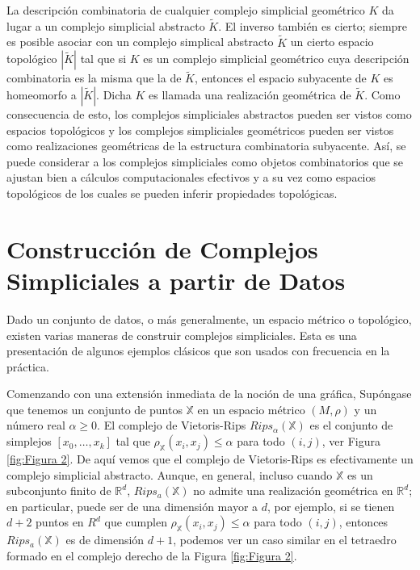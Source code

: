 La descripci\'on combinatoria de cualquier complejo simplicial geom\'etrico $K$ da lugar a un complejo
simplicial abstracto $\tilde{K}$. El inverso tambi\'en es cierto; siempre es posible asociar con un
complejo simplical abstracto $\tilde{K}$ un cierto espacio topol\'ogico $|\tilde{K}|$
tal que si $K$ es un complejo simplicial geom\'etrico cuya descripci\'on combinatoria es la misma
que la de $\tilde{K}$, entonces el espacio subyacente de $K$ es homeomorfo a $|\tilde{K}|$.
Dicha $K$ es llamada una realizaci\'on geom\'etrica de $\tilde{K}$. Como consecuencia de esto,
los complejos simpliciales abstractos pueden ser vistos como espacios topol\'ogicos y los complejos
simpliciales geom\'etricos pueden ser vistos como realizaciones geom\'etricas de la estructura combinatoria
subyacente. As\'i, se puede considerar a los complejos simpliciales como objetos combinatorios que se
ajustan bien a c\'alculos computacionales efectivos y a su vez como espacios topol\'ogicos de los cuales se pueden
inferir propiedades topol\'ogicas.

\section*{Construcci\'on de Complejos Simpliciales a partir de Datos}

Dado un conjunto de datos, o m\'as generalmente, un espacio m\'etrico o topol\'ogico, existen varias
maneras de construir complejos simpliciales. Esta es una presentaci\'on de algunos ejemplos cl\'asicos
que son usados con frecuencia en la pr\'actica.

Comenzando con una extensi\'on inmediata de la noci\'on de una gr\'afica, Sup\'ongase que
tenemos un conjunto de puntos $\mathbb{X}$ en un espacio m\'etrico $\left(M, \rho\right)$ y un n\'umero
real $\alpha \geq 0$. El complejo de Vietoris-Rips $Rips_{\alpha}\left(\mathbb{X}\right)$ es el conjunto
de simplejos $\left[x_{0}, \dots, x_{k}\right]$ tal que
$\rho_{\mathbb{X}}\left(x_{i}, x_{j}\right)\leq\alpha$ para todo
$\left(i, j\right)$, ver Figura \ref{fig:Figura 2}. De aqu\'i vemos que el complejo de
Vietoris-Rips es efectivamente
un complejo simplicial abstracto. Aunque, en general, incluso cuando $\mathbb{X}$ es un subconjunto
finito de $\mathbb{R}^{d}$, $Rips_{a}\left(\mathbb{X}\right)$ no admite una realizaci\'on geom\'etrica en
$\mathbb{R}^{d}$; en particular, puede ser de una dimensi\'on mayor a $d$, por ejemplo, si se tienen $d+2$
puntos en $R^{d}$ que cumplen $\rho_{\mathbb{X}}\left(x_{i},x_{j}\right)\leq\alpha$ para todo
$\left(i,j\right)$, entonces $Rips_{a}\left(\mathbb{X}\right)$ es de dimensi\'on $d+1$, podemos ver un
caso similar en el tetraedro formado en el complejo derecho de la Figura \ref{fig:Figura 2}.

